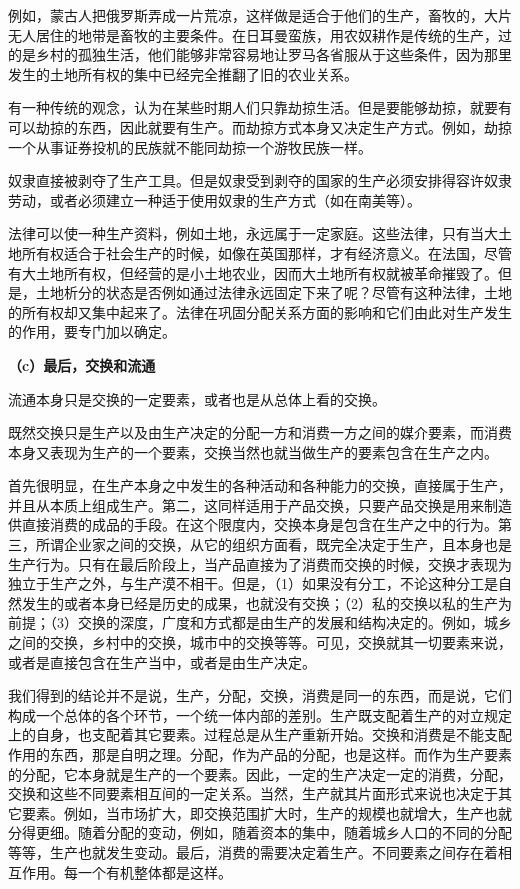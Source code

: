 \documentclass[a4paper,twoside,12pt]{ctexart}
\begin{document}
例如，蒙古人把俄罗斯弄成一片荒凉，这样做是适合于他们的生产，畜牧的，大片无人居住的地带是畜牧的主要条件。在日耳曼蛮族，用农奴耕作是传统的生产，过的是乡村的孤独生活，他们能够非常容易地让罗马各省服从于这些条件，因为那里发生的土地所有权的集中已经完全推翻了旧的农业关系。

有一种传统的观念，认为在某些时期人们只靠劫掠生活。但是要能够劫掠，就要有可以劫掠的东西，因此就要有生产。而劫掠方式本身又决定生产方式。例如，劫掠一个从事证券投机的民族就不能同劫掠一个游牧民族一样。

奴隶直接被剥夺了生产工具。但是奴隶受到剥夺的国家的生产必须安排得容许奴隶劳动，或者必须建立一种适于使用奴隶的生产方式（如在南美等）。

法律可以使一种生产资料，例如土地，永远属于一定家庭。这些法律，只有当大土地所有权适合于社会生产的时候，如像在英国那样，才有经济意义。在法国，尽管有大土地所有权，但经营的是小土地农业，因而大土地所有权就被革命摧毁了。但是，土地析分的状态是否例如通过法律永远固定下来了呢？尽管有这种法律，土地的所有权却又集中起来了。法律在巩固分配关系方面的影响和它们由此对生产发生的作用，要专门加以确定。

\textbf{（c）最后，交换和流通}

流通本身只是交换的一定要素，或者也是从总体上看的交换。

既然交换只是生产以及由生产决定的分配一方和消费一方之间的媒介要素，而消费本身又表现为生产的一个要素，交换当然也就当做生产的要素包含在生产之内。

首先很明显，在生产本身之中发生的各种活动和各种能力的交换，直接属于生产，并且从本质上组成生产。第二，这同样适用于产品交换，只要产品交换是用来制造供直接消费的成品的手段。在这个限度内，交换本身是包含在生产之中的行为。第三，所谓企业家之间的交换，从它的组织方面看，既完全决定于生产，且本身也是生产行为。只有在最后阶段上，当产品直接为了消费而交换的时候，交换才表现为独立于生产之外，与生产漠不相干。但是，（1）如果没有分工，不论这种分工是自然发生的或者本身已经是历史的成果，也就没有交换；（2）私的交换以私的生产为前提；（3）交换的深度，广度和方式都是由生产的发展和结构决定的。例如，城乡之间的交换，乡村中的交换，城市中的交换等等。可见，交换就其一切要素来说，或者是直接包含在生产当中，或者是由生产决定。

我们得到的结论并不是说，生产，分配，交换，消费是同一的东西，而是说，它们构成一个总体的各个环节，一个统一体内部的差别。生产既支配着生产的对立规定上的自身，也支配着其它要素。过程总是从生产重新开始。交换和消费是不能支配作用的东西，那是自明之理。分配，作为产品的分配，也是这样。而作为生产要素的分配，它本身就是生产的一个要素。因此，一定的生产决定一定的消费，分配，交换和这些不同要素相互间的一定关系。当然，生产就其片面形式来说也决定于其它要素。例如，当市场扩大，即交换范围扩大时，生产的规模也就增大，生产也就分得更细。随着分配的变动，例如，随着资本的集中，随着城乡人口的不同的分配等等，生产也就发生变动。最后，消费的需要决定着生产。不同要素之间存在着相互作用。每一个有机整体都是这样。
\end{document}
